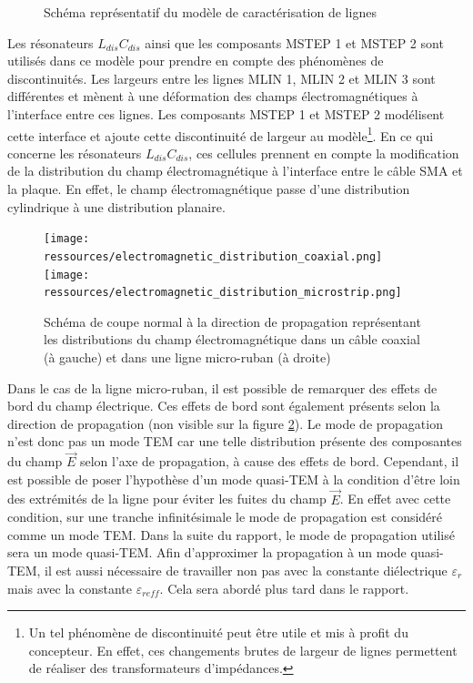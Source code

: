 \documentclass[french]{article}
\begin{document}
\begin{figure}[H]
	\centering
	
	\caption{Schéma représentatif du modèle de caractérisation de lignes}
	\label{fig:schema_modele_caract}
\end{figure}

Les résonateurs $L_{dis}C_{dis}$ ainsi que les composants MSTEP 1 et MSTEP 2 sont utilisés dans ce modèle pour prendre en compte des phénomènes de discontinuités. Les largeurs entre les lignes MLIN 1, MLIN 2 et MLIN 3 sont différentes et mènent à une déformation des champs électromagnétiques à l'interface entre ces lignes. Les composants MSTEP 1 et MSTEP 2 modélisent cette interface et ajoute cette discontinuité de largeur au modèle\footnote{Un tel phénomène de discontinuité peut être utile et mis à profit du concepteur. En effet, ces changements brutes de largeur de lignes permettent de réaliser des transformateurs d'impédances.}. En ce qui concerne les résonateurs $L_{dis}C_{dis}$, ces cellules prennent en compte la modification de la distribution du champ électromagnétique à l'interface entre le câble SMA et la plaque. En effet, le champ électromagnétique passe d'une distribution cylindrique à une distribution planaire.


\begin{figure}[H]
	\centering
	\texttt{[image: ressources/electromagnetic\_distribution\_coaxial.png]}
	\texttt{[image: ressources/electromagnetic\_distribution\_microstrip.png]}
	\caption{Schéma de coupe normal à la direction de propagation représentant les distributions du champ électromagnétique dans un câble coaxial (à gauche) et dans une ligne micro-ruban (à droite)}
	\label{fig:schema_distribution_EOM}
\end{figure}

\newpage

Dans le cas de la ligne micro-ruban, il est possible de remarquer des effets de bord du champ électrique. Ces effets de bord sont également présents selon la direction de propagation (non visible sur la figure \ref{fig:schema_distribution_EOM}). Le mode de propagation n'est donc pas un mode TEM car une telle distribution présente des composantes du champ $\overrightarrow{E}$ selon l'axe de propagation, à cause des effets de bord. Cependant, il est possible de poser l'hypothèse d'un mode quasi-TEM à la condition d'être loin des extrémités de la ligne pour éviter les fuites du champ $\overrightarrow{E}$. En effet avec cette condition, sur une tranche infinitésimale le mode de propagation est considéré comme un mode TEM. Dans la suite du rapport, le mode de propagation utilisé sera un mode quasi-TEM. Afin d'approximer la propagation à un mode quasi-TEM, il est aussi nécessaire de travailler non pas avec la constante diélectrique $\varepsilon_r$ mais avec la constante $\varepsilon_{reff}$. Cela sera abordé plus tard dans le rapport.
\end{document}
